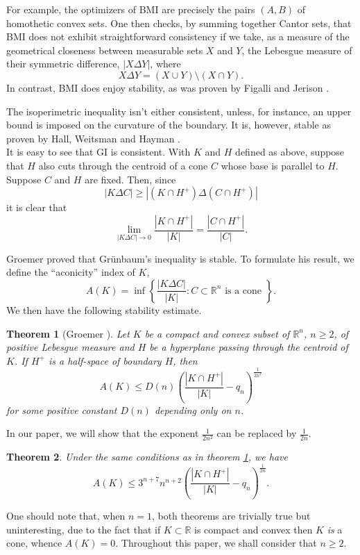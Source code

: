 \documentclass[12pt,reqno]{amsart}
\newcommand{\R}{\mathbb{R}}
\theoremstyle{plain}
\newtheorem{teor}{Theorem}[section]
\theoremstyle{definition}
\theoremstyle{remark}
\numberwithin{equation}{section}
\begin{document}
For example, the optimizers of BMI are precisely the pairs $(A,B)$ of homothetic convex sets. One then checks, by summing together Cantor sets, that BMI does not exhibit straightforward consistency if we take, as a measure of the geometrical closeness between measurable sets $X$ and $Y$, the Lebesgue measure of their symmetric difference, $|X\Delta Y|$, where $$X\Delta Y = (X\cup Y)\setminus (X\cap Y).$$
In contrast, BMI does enjoy stability, as was proven by Figalli and Jerison \cite{SS}.

The isoperimetric inequality isn't either consistent, unless, for instance, an upper bound is imposed on the curvature of the boundary. It is, however, stable as proven by Hall, Weitsman and Hayman \cite{HH,HHH}.
\\

It is easy to see that GI is consistent. With $K$ and $H$ defined as above, suppose that $H$ also cuts through the centroid of a cone $C$ whose base is parallel to $H$. Suppose $C$ and $H$ are fixed. Then, since $$|K\Delta C|\geq |(K\cap H^+)\Delta (C\cap H^+)|$$it is clear that
$$\lim _{|K\Delta C|\to 0}\frac{|K\cap H^+|}{|K|}=\frac{|C\cap H^+|}{|C|}.$$

Groemer \cite{Groemer} proved that Grünbaum's inequality is stable. To formulate his result, we define the ``aconicity'' index of $K$,
$$A(K)=\inf\left\{ \frac{|K\Delta C|}{|K|} : C\subset \R^n \text{ is a cone } \right\}.$$
We then have the following stability estimate.

\begin{teor}[Groemer \cite{Groemer}] \label{groe_theo}Let $K$ be a compact and convex subset of $\mathbb{R}^n$, $n\geq 2$, of positive Lebesgue measure and $H$ be a hyperplane passing through the centroid of $K$. If $H^+$ is a half-space of boundary $H$, then
    $$A(K)\leq D(n) \left(\frac{|K\cap H^+|}{|K|}-q_n\right)^{\frac{1}{2n^2}}$$
    for some positive constant $D(n)$ depending only on $n$.
\end{teor}

In our paper, we will show that the exponent $\frac{1}{2n^2}$ can be replaced by $\frac{1}{2n}$.

\begin{teor}\label{maintheo}
    Under the same conditions as in theorem \ref{groe_theo}, we have
$$A(K)\leq 3^{n+7}n^{n+2} \left(\frac{|K\cap H^+|}{|K|}-q_n\right)^{\frac{1}{2n}}.$$
\end{teor}

One should note that, when $n=1$, both theorems are trivially true but uninteresting, due to the fact that if $K\subset\mathbb{R}$ is compact and convex then $K$ \textit{is} a cone, whence $A(K)=0$. Throughout this paper, we shall consider that $n\geq 2$.
\end{document}
